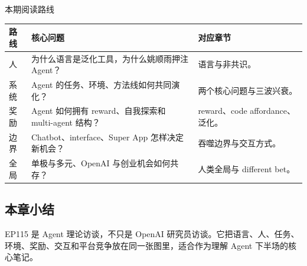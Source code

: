 \begin{knowledgebox}{本期阅读路线}
\begin{tabularx}{\textwidth}{p{}p{}X}
\toprule
路线 & 核心问题 & 对应章节 \\
\midrule
人 & 为什么语言是泛化工具，为什么姚顺雨押注 Agent？ & 语言与非共识。 \\
系统 & Agent 的任务、环境、方法线如何共同演化？ & 两个核心问题与三波兴衰。 \\
奖励 & Agent 如何拥有 reward、自我探索和 multi-agent 结构？ & reward、code affordance、泛化。 \\
边界 & Chatbot、interface、Super App 怎样决定新机会？ & 吞噬边界与交互方式。 \\
全局 & 单极与多元、OpenAI 与创业机会如何共存？ & 人类全局与 different bet。 \\
\bottomrule
\end{tabularx}
\end{knowledgebox}

\subsection{本章小结}

EP115 是 Agent 理论访谈，不只是 OpenAI 研究员访谈。它把语言、人、任务、环境、奖励、交互和平台竞争放在同一张图里，适合作为理解 Agent 下半场的核心笔记。


